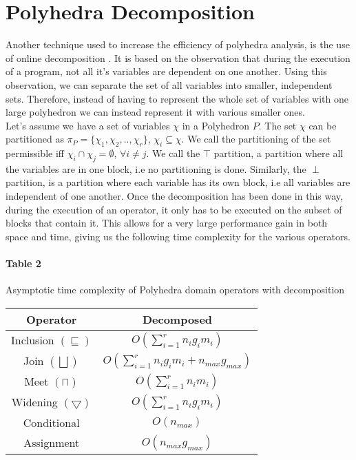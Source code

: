  \section{Polyhedra Decomposition}
Another technique used to increase the efficiency of polyhedra analysis, is the use of online decomposition \cite{singh2017fast}. It is based on the observation that during the execution of a program, not all it's variables are dependent on one another. Using this observation, we can separate the set of all variables into smaller, independent sets. Therefore, instead of having to represent the whole set of variables with one large polyhedron we can instead represent it with various smaller ones.\\ Let's assume we have a set of variables $\chi$ in a Polyhedron $P$. The set $\chi$ can be partitioned as $\pi_P=\{ \chi_1,\chi_2,..,\chi_r\}$, $\chi_i\subseteq\chi $. We call the partitioning of the set permissible iff $ \chi_i \cap \chi_j = \emptyset$, $ \forall i \neq j$. We call the $\top$ partition, a partition where all the variables are in one block, i.e no partitioning is done. Similarly, the $\perp$ partition, is a partition where each variable has its own block, i.e all variables are independent of one another. Once the decomposition has been done in this way, during the execution of an operator, it only has to be executed on the subset of blocks that contain it. This allows for a very large performance gain in both space and time, giving us the following time complexity for the various operators.

\paragraph{Table 2} Asymptotic time complexity of Polyhedra domain operators with decomposition

\begin{center}
\begin{tabular}{||c c||} 
 
 \hline
 Operator & Decomposed  \\ [0.5ex] 
 \hline
 Inclusion $(\sqsubseteq)$ & $O(\sum_{i=1}^r n_ig_im_i)$\\ 
 \hline
 Join $(\bigsqcup)$ & $O(\sum_{i=1}^r n_i g_i m_i + n_{max} g_{max})$ \\
 \hline
 Meet $(\sqcap)$ & $O(\sum_{i=1}^r n_i m_i)$ \\
 \hline
 Widening $(\bigtriangledown)$ & $O(\sum_{i=1}^r n_i g_i m_i)$\\
 \hline
 Conditional & $O(n_{max})$ \\ 
 \hline
 Assignment & $O(n_{max}g_{max})$ \\ 
 
 
 \hline
\end{tabular}
\end{center}


